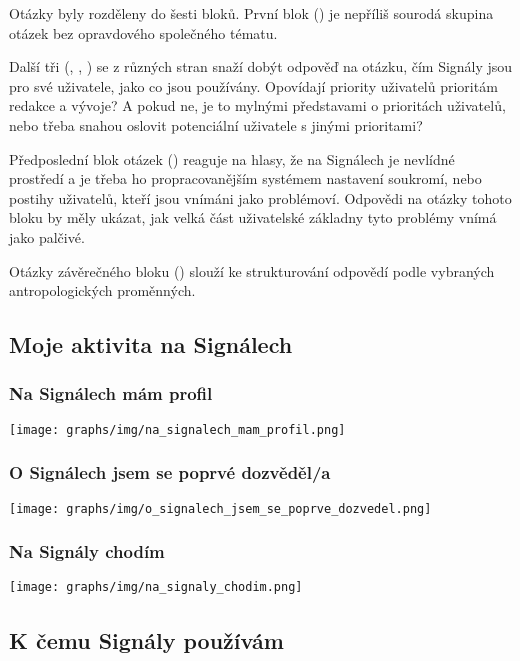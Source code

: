 \documentclass[12pt, a4paper, twoside]{article}
\begin{document}
Otázky byly rozděleny do šesti bloků.
První blok ()
je nepříliš sourodá skupina otázek bez opravdového společného tématu.

Další tři
(, , )
se z různých stran snaží dobýt odpověď na otázku, čím Signály jsou
pro své uživatele, jako co jsou používány.
Opovídají priority uživatelů prioritám redakce a vývoje?
A pokud ne, je to mylnými představami o prioritách uživatelů,
nebo třeba snahou oslovit potenciální uživatele s jinými prioritami?

Předposlední blok otázek ()
reaguje na hlasy, že na Signálech je nevlídné prostředí
a je třeba ho  propracovanějším systémem nastavení
soukromí, nebo postihy uživatelů, kteří jsou vnímáni jako problémoví.
Odpovědi na otázky tohoto bloku by měly ukázat, jak velká část
uživatelské základny tyto problémy vnímá jako palčivé.

Otázky závěrečného bloku ()
slouží ke strukturování odpovědí
podle vybraných antropologických proměnných.

\subsection{Moje aktivita na Signálech}\label{sec:mojeaktivita}

\subsubsection{Na Signálech mám profil}

\texttt{[image: graphs/img/na\_signalech\_mam\_profil.png]}

\subsubsection{O Signálech jsem se poprvé dozvěděl/a}

\texttt{[image: graphs/img/o\_signalech\_jsem\_se\_poprve\_dozvedel.png]}

\subsubsection{Na Signály chodím}

\texttt{[image: graphs/img/na\_signaly\_chodim.png]}

\subsection{K čemu Signály používám}\label{sec:kcemu}
\end{document}
